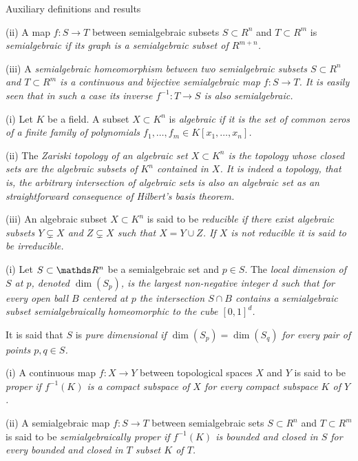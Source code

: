 \documentclass[11pt, a4paper, english, twoside, notitlepage, openright]{report}
\begin{document}
\begin{chapter}{Auxiliary definitions and results}
\begin{definitions}
	
(ii) A map $f:S\to T$ between semialgebraic subsets $S\subset R^n$ and $T\subset R^m$ is \em semialgebraic \em if its graph is a semialgebraic subset of $R^{m+n}$.  \end{definitions}


(iii) A \em semialgebraic homeomorphism \em between two semialgebraic subsets $S\subset R^n$ and $T\subset R^m$ is a continuous and bijective semialgebraic map $f:S\to T$. It is easily seen that in such a case its inverse $f^{-1}:T\to S$ is also semialgebraic.


\begin{definition}\label{zariski} (i) Let $K$ be a field. A subset $X\subset K^n$ is \em algebraic \em if it is the set of common zeros of a finite family of polynomials $f_1,\dots,f_m\in K[x_1,\dots, x_n]$. 

(ii) The \em Zariski topology \em of an algebraic set $X\subset K^n$ is the topology whose closed sets are the algebraic subsets of $K^n$ contained in $X$. It is indeed a topology, that is, the arbitrary intersection of algebraic sets is also an algebraic set as an straightforward consequence of Hilbert's basis theorem.

(iii) An algebraic subset $X\subset K^n$ is said to be \em reducible \em if there exist algebraic subsets $Y\subsetneq X$ and  $Z\subsetneq X$ such that $X=Y\cup Z$. If $X$ is not reducible it is said to be  \em irreducible. \em 
\end{definition}

\begin{definition}\label{pureDim} (i) Let $S\subset\R^n$ be a semialgebraic set and $p\in S$. The \em local dimension of $S$ at $p$, \em denoted $\dim(S_p)$, is the largest non-negative integer $d$ such that for every open ball $B$ centered at $p$ the intersection $S\cap B$ contains a semialgebraic subset semialgebraically homeomorphic to the cube $[0,1]^d$.

	It is said that $S$ is \em pure dimensional \em if $\dim(S_p)=\dim(S_q)$ for every pair of points $p,q\in S$.
\end{definition}

\begin{definitions}\label{properMap}
	  (i) A continuous map $f:X\to Y$ between topological spaces $X$ and $Y$ is said to be \em proper \em if $f^{-1}(K)$ is a compact subspace of $X$ for every compact subspace $K$ of $Y$. 
	  
	  (ii) A semialgebraic map $f:S\to T$ between semialgebraic sets $S\subset R^n$ and $T\subset R^m$ is said to be \em semialgebraically proper \em if $f^{-1}(K)$ is bounded and closed in $S$ for every bounded and closed in $T$ subset $K$ of $T$.  
\end{definitions}


\end{chapter}
\end{document}
